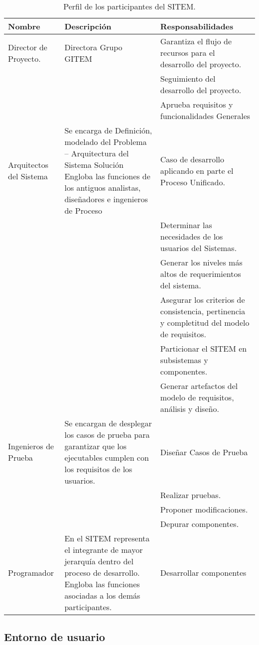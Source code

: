 \begin{table}
\begin{center}
\begin{tabular}{|p{4cm}|p{5cm}|p{5cm}|}
\hline
\textbf{Nombre} & \textbf{Descripción} & \textbf{Responsabilidades}\\
\hline
Director de Proyecto. & Directora Grupo GITEM & Garantiza el flujo de recursos para el desarrollo del proyecto.\\
&&Seguimiento del desarrollo del proyecto.\\
&&Aprueba requisitos y funcionalidades Generales\\
\hline
Arquitectos del Sistema & Se encarga de Definición, modelado del Problema – Arquitectura del Sistema Solución Engloba las funciones de los antiguos analistas, diseñadores e ingenieros de Proceso &Caso de desarrollo aplicando en parte el Proceso Unificado.\\
&&Determinar las necesidades de los usuarios del Sistemas.\\
&&Generar los niveles más altos de requerimientos del sistema.\\
&&Asegurar los criterios de consistencia, pertinencia y completitud del modelo de requisitos.\\
&&Particionar el SITEM en subsistemas y componentes.\\
&&Generar artefactos del modelo de requisitos, análisis y diseño.\\
\hline
Ingenieros de Prueba & Se encargan de desplegar los casos de prueba para garantizar que los ejecutables cumplen con los requisitos de los usuarios.& Diseñar Casos de Prueba\\
&&Realizar pruebas.\\
&&Proponer modificaciones.\\
&&Depurar componentes.\\
\hline
Programador& En el SITEM representa el integrante de mayor jerarquía dentro del proceso de desarrollo. Engloba las funciones asociadas a los demás participantes. & Desarrollar componentes\\
\hline
\end{tabular}
\caption{Perfil de los participantes del SITEM.}
\label{participantes_sitem} 
\end{center}
\end{table}

\subsection{Entorno de usuario}

